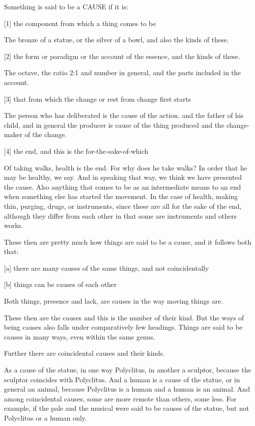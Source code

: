 
Something is said to be a CAUSE if it is:

[1]     the component from which a thing comes to be

        The bronze of a statue, or the silver of a bowl, and also
        the kinds of these.

[2]     the form or paradigm or the account of the essence, and
        the kinds of these.

        The octave, the ratio 2:1 and number in general,
        and the parts included in the account.

[3]     that from which the change or rest from change first starts

        The person who has deliberated is the cause of the action.
        and the father of his child, and in general the producer is
        cause of the thing produced and the change-maker of the change.

[4]     the end, and this is the for-the-sake-of-which

        Of taking walks, health is the end. For why does he take walks?
        In order that he may be healthy, we say. And in speaking that way,
        we think we have presented the cause. Also anything that comes to be
        as an intermediate means to an end when something else has started
        the movement. In the case of health, making thin, purging, drugs,
        or instruments, since these are all for the sake of the end,
        although they differ from each other in that some are instruments
        and others works.

These then are pretty much how things are said to be a cause,
and it follows both that:

[a]     there are many causes of the same things, and not coincidentally

[b]     things can be causes of each other

Both things, presence and lack, are causes in the way moving things are.



These then are the causes and this is the number of their kind.
But the ways of being causes also falls under comparatively few headings.
Things are said to be causes in many ways, even within the same genus.

Further there are coincidental causes and their kinds.

        As a cause of the statue, in one way Polyclitus, in another a sculptor,
        because the sculptor coincides with Polyclitus. And a human is a cause
        of the statue, or in general an animal, because Polyclitus is a human
        and a human is an animal. And among coincidental causes, some are more
        remote than others, some less. For example, if the pale and the musical
        were said to be causes of the statue, but not Polyclitus or a human only.

